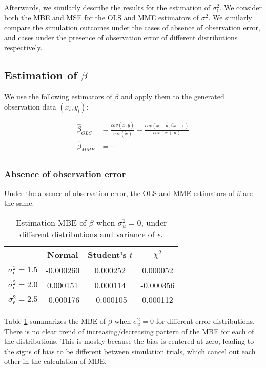 \documentclass{article}
\begin{document}
Afterwards, we similarly describe the results for the estimation of $\sigma^2_\epsilon$.
We consider both the MBE and MSE for the OLS and MME estimators of $\sigma^2$.
We similarly compare the simulation outcomes under the cases of absence of observation error, and cases under the presence of observation error of different distributions respectively.

\subsection{Estimation of $\beta$}

We use the following estimators of $\beta$ and apply them to the generated observation data $(x_i, y_i)$:

\begin{equation}
    \begin{split}
        \hat{\beta}_{OLS} &= \frac{cov(\tilde{x, y})}{var(\tilde{x})} = \frac{cov(x+u, \beta x + \epsilon)}{var(x + u)}\\
        \hat{\beta}_{MME} &= \cdots\\
    \end{split}
\end{equation}

\subsubsection{Absence of observation error}

Under the absence of observation error, the OLS and MME estimators of $\beta$ are the same.

\begin{table}[ht]
    \centering
    \caption{Estimation MBE of $\beta$ when $\sigma^2_u=0$, under different distributions and variance of $\epsilon$.}
    \label{Tab:MBE_absence}
    \begin{tabular}[t]{lccc}
        \hline
        &Normal&Student's $t$&$\chi^2$\\
        \hline
        $\sigma^2_\epsilon = 1.5$&-0.000260& 0.000252& 0.000052\\
        $\sigma^2_\epsilon = 2.0$& 0.000151& 0.000114&-0.000356\\
        $\sigma^2_\epsilon = 2.5$&-0.000176&-0.000105& 0.000112\\
        \hline
    \end{tabular}
\end{table}

Table \ref{Tab:MBE_absence} summarizes the MBE of $\beta$ when $\sigma^2_u=0$ for different error distributions.
There is no clear trend of increasing/decreasing pattern of the MBE for each of the distributions. 
This is mostly because the bias is centered at zero, leading to the signs of bias to be different between simulation trials, which cancel out each other in the calculation of MBE. 
\end{document}
